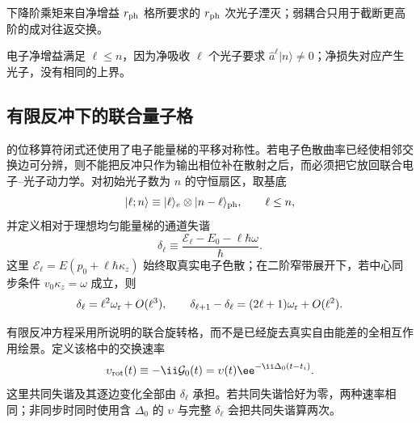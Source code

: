 



下降阶乘矩来自净增益 $r_{\rm ph}$ 格所要求的 $r_{\rm ph}$ 次光子湮灭；弱耦合只用于截断更高阶的成对往返交换。

电子净增益满足 $\ell\le n$，因为净吸收 $\ell$ 个光子要求 $\hat a^\ell|n\rangle\neq0$；净损失对应产生光子，没有相同的上界。






\subsection{有限反冲下的联合量子格}\label{subsec:qpinem-finite-recoil-lattice-dp46}

 的位移算符闭式还使用了电子能量梯的平移对称性。若电子色散曲率已经使相邻交换边可分辨，则不能把反冲只作为输出相位补在散射之后，而必须把它放回联合电子--光子动力学。对初始光子数为 $n$ 的守恒扇区，取基底
\begin{equation*}
 |\ell;n\rangle\equiv|\ell\rangle_e\otimes|n-\ell\rangle_{\rm ph},
 \qquad \ell\le n,
\end{equation*}
并定义相对于理想均匀能量梯的通道失谐
\begin{equation}
{
 \delta_\ell
 \equiv\frac{\mathcal E_\ell-E_0-\ell\hbar\omega}{\hbar}.}
\label{eq:qpinem_recoil_channel_detuning_dp46}
\end{equation}
这里 $\mathcal E_\ell=E(p_0+\ell\hbar \kappa_z)$ 始终取真实电子色散；在二阶窄带展开下，若中心同步条件 $v_0\kappa_z=\omega$ 成立，则
\begin{equation}
 \delta_\ell=\ell^2\omega_{\rm r}+O(\ell^3),
 \qquad
 \delta_{\ell+1}-\delta_\ell=(2\ell+1)\omega_{\rm r}+O(\ell^2).
\label{eq:qpinem_recoil_detuning_quadratic_dp46}
\end{equation}

有限反冲方程采用所说明的联合旋转格，而不是已经旋去真实自由能差的全相互作用绘景。定义该格中的交换速率
\begin{equation}
 \upsilon_{\rm rot}(t)\equiv-\ii\mathcal G_0(t)
 =\upsilon(t)\ee^{-\ii\Delta_0(t-t_i)}.
 \label{eq:feqo-single-mode-coupling-frame}
\end{equation}
这里共同失谐及其逐边变化全部由 $\delta_\ell$ 承担。若共同失谐恰好为零，两种速率相同；非同步时同时使用含 $\Delta_0$ 的 $\upsilon$ 与完整 $\delta_\ell$ 会把共同失谐算两次。

